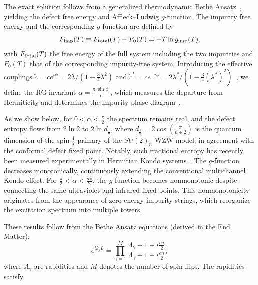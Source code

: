 \documentclass[aps,  prb,twocolumn,
  superscriptaddress,  floatfix,  10pt         
]{revtex4-2}
\begin{document}
The exact solution follows from a generalized thermodynamic Bethe Ansatz~\cite{yang1969thermodynamics,takahashi1999thermodynamics,andrei1983solution,zhakenov2025thermodynamics,kattel2026thermodynamics}, yielding the defect free energy and Affleck--Ludwig $g$-function. The impurity free energy and the corresponding $g$-function are defined by
\begin{equation}
F_{\rm imp}(T)
\equiv F_{\rm total}(T)-F_0(T)
=-T\ln g_{\rm imp}(T),
\end{equation}
with $F_{\rm total}(T)$ the free energy of the full system including the two impurities and $F_0(T)$ that of the corresponding impurity-free system. Introducing the effective couplings $\tilde c=ce^{i\phi}=2\lambda/\left(1-\frac34\lambda^2\right)$ and $\tilde c^{*}=ce^{-i\phi}=2\lambda^{*}/\left(1-\frac34(\lambda^{*})^2\right)$~\cite{andrei1983solution,kattel2025dissipation}, we define the RG invariant $\alpha=\frac{\pi|\sin\phi|}{c}$, which measures the departure from Hermiticity and determines the impurity phase diagram~\cite{kattel2025dissipation}.

As we show below, for $0<\alpha<\frac{\pi}{2}$ the spectrum remains real, and the defect entropy flows from $2\ln2$ to $2\ln d_{\frac12}$, where $d_{\frac12}=2\cos\left(\frac{\pi}{n+2}\right)$ is the quantum dimension of the spin-$\frac12$ primary of the $SU(2)_n$ WZW model, in agreement with the conformal defect fixed point. Notably, such fractional entropy has recently been measured experimentally in Hermitian Kondo systems~\cite{child2022entropy,piquard2026experimental}. The $g$-function decreases monotonically, continuously extending the conventional multichannel Kondo effect. For $\frac{\pi}{2}<\alpha<\frac{n\pi}{2}$, the $g$-function becomes nonmonotonic despite connecting the same ultraviolet and infrared fixed points. This nonmonotonicity originates from the appearance of zero-energy impurity strings, which reorganize the excitation spectrum into multiple towers.



These results follow from the Bethe Ansatz equations (derived in the End Matter):
\begin{equation}
e^{i k_{j} L} =\prod_{\gamma=1}^{M} \frac{\Lambda_{\gamma}-1+i \frac{cn}{2}}
     {\Lambda_{\gamma}-1-i \frac{cn}{2}},
\end{equation}
where $\Lambda_\gamma$ are rapidities and $M$ denotes the number of spin flips. The rapidities satisfy
\end{document}
